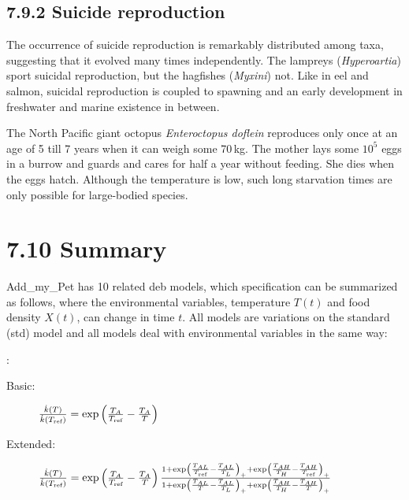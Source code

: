 \subsection*{7.9.2 Suicide reproduction}
{}
\label{sec_c:suicide}

The occurrence of suicide reproduction is remarkably distributed among taxa, suggesting that it evolved many times independently.
The lampreys (\emph{Hyperoartia}) sport suicidal reproduction, but the hagfishes (\emph{Myxini}) not.
Like in eel and salmon, suicidal reproduction is coupled to spawning and an early development in freshwater and marine existence in between.

The North Pacific giant octopus \emph{Enteroctopus doflein} reproduces only once at an age of 5 till 7 years when it can weigh some 70\,kg.
The mother lays some $10^5$ eggs in a burrow and guards and cares for half a year without feeding. 
She dies when the eggs hatch.
Although the temperature is low, such long starvation times are only possible for large-bodied species.

\section*{7.10 Summary}
{}
\label{sec_c:d_i-states}

Add\_my\_Pet has 10 related {\sc deb} models, which specification can be summarized as follows, where
the environmental variables, temperature $T(t)$ and food density $X(t)$, can change in time $t$.
All models are variations on the standard (std) model and
all models deal with environmental variables in the same way:

\vspace{5mm}: {\small
\begin{description}
   \item[Basic: ]  $\frac{\dot{k}(T)} {\dot{k}(T_{\mbox{\tiny ref}})} =  
	    \exp \left( \frac{T_A} {T_{\mbox{\tiny ref}}} - \frac{T_A} {T} \right)$

   \item[Extended: ]  $\frac{\dot{k}(T)} {\dot{k}(T_{\mbox{\tiny ref}})} =  
	    \exp \left( \frac{T_A} {T_{\mbox{\tiny ref}}} - \frac{T_A} {T} \right) 
			\frac{1 + \exp\left(\frac{T_{AL}} {T_{\mbox{\tiny ref}}} - \frac{T_{AL}} {T_L}\right)_+ + 
			          \exp\left(\frac{T_{AH}} {T_H} - \frac{T_{AH}} {T_{\mbox{\tiny ref}}}\right)_+}
	         {1 + \exp \left( \frac{T_{AL}} {T} - \frac{T_{AL}} {T_L} \right)_+ + \exp \left(\frac{T_{AH}} {T_H} - \frac{T_{AH}} {T} \right)_+}$
\end{description}}

